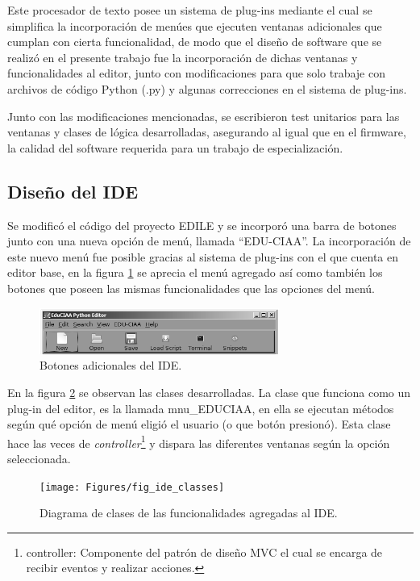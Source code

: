 Este procesador de texto posee un sistema de plug-ins mediante el cual se simplifica la incorporación de menúes que ejecuten ventanas adicionales que cumplan con cierta funcionalidad, de modo que el diseño de software que se realizó en el presente trabajo fue la incorporación de dichas ventanas y funcionalidades al editor, junto con modificaciones para que solo trabaje con archivos de código Python (.py) y algunas correcciones en el sistema de plug-ins.

Junto con las modificaciones mencionadas, se escribieron test unitarios para las ventanas y clases de lógica desarrolladas, asegurando al igual que en el firmware, la calidad del software requerida para un trabajo de especialización.

\subsection{Diseño del IDE} 

Se modificó el código del proyecto EDILE y se incorporó una barra de botones junto con una nueva opción de menú, llamada “EDU-CIAA”. La incorporación de este nuevo menú fue posible gracias al sistema de plug-ins con el que cuenta en editor base, en la figura \ref{fig:idebuttons} se aprecia el menú agregado así como también los botones que poseen las mismas funcionalidades que las opciones del menú.

\begin{figure}[ht]
  \centering
    \includegraphics[width=0.7\textwidth]{Figures/fig_ide_buttons}
  \caption{Botones adicionales del IDE.}
  \label{fig:idebuttons}
\end{figure}

En la figura \ref{fig:ideclasses} se observan las clases desarrolladas. La clase que funciona como un plug-in del editor, es la llamada mnu\_EDUCIAA, en ella se ejecutan métodos según qué opción de menú eligió el usuario (o que botón presionó). Esta clase hace las veces de \textit{controller}\footnote{controller: Componente del patrón de diseño MVC el cual se encarga de recibir eventos y realizar acciones.} y dispara las diferentes ventanas según la opción seleccionada.

\begin{figure}[ht]
  \centering
    \texttt{[image: Figures/fig\_ide\_classes]}
  \caption{Diagrama de clases de las funcionalidades agregadas al IDE.}
  \label{fig:ideclasses}
\end{figure}

